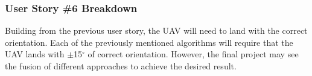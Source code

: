 \subsubsection{User Story \#6 Breakdown}
Building from the previous user story, the UAV will need to land with the correct orientation. Each of the previously mentioned algorithms will require that the UAV lands with $\pm$15$^{\circ}$ of correct orientation. However, the final project may see the fusion of different approaches to achieve the desired result. \\





